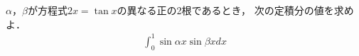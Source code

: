 \documentclass[../../main.tex]{subfiles}
\begin{document}
$\alpha$，$\beta$が方程式$2x=\tan x$の異なる正の2根であるとき，
次の定積分の値を求めよ．
\begin{align}
  \int_0^1\sin\alpha x\sin\beta xdx
\end{align}
\end{document}
